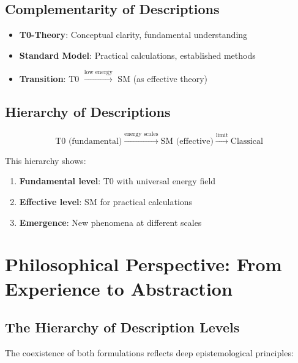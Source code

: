 \documentclass[12pt,a4paper]{article}
\begin{document}
	\subsection{Complementarity of Descriptions}
	
	\begin{tcolorbox}[colback=yellow!5!white,colframe=yellow!75!black,title=Fundamental Complementarity]
		\begin{itemize}
			\item \textbf{T0-Theory}: Conceptual clarity, fundamental understanding
			\item \textbf{Standard Model}: Practical calculations, established methods
			\item \textbf{Transition}: T0 $\xrightarrow{\text{low energy}}$ SM (as effective theory)
		\end{itemize}
	\end{tcolorbox}
	
	\subsection{Hierarchy of Descriptions}
	
	\begin{equation}
		\text{T0 (fundamental)} \xrightarrow{\text{energy scales}} \text{SM (effective)} \xrightarrow{\text{limit}} \text{Classical}
	\end{equation}
	
	This hierarchy shows:
	\begin{enumerate}
		\item \textbf{Fundamental level}: T0 with universal energy field
		\item \textbf{Effective level}: SM for practical calculations
		\item \textbf{Emergence}: New phenomena at different scales
	\end{enumerate}
	
	\section{Philosophical Perspective: From Experience to Abstraction}
	
	\subsection{The Hierarchy of Description Levels}
	
	The coexistence of both formulations reflects deep epistemological principles:
	
\end{document}
